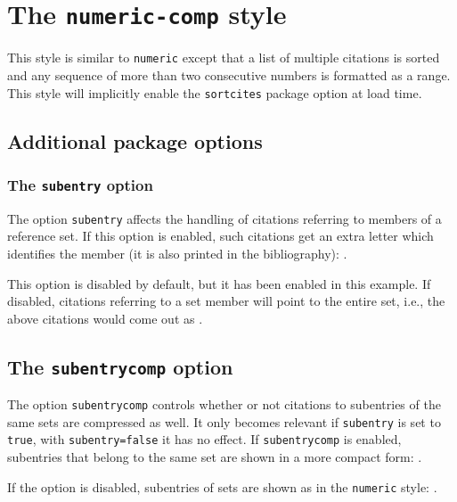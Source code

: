 \documentclass[a4paper]{article}
\begin{document}
\section*{The \texttt{numeric-comp} style}

This style is similar to \texttt{numeric} except that a list of
multiple citations is sorted and any sequence of more than two
consecutive numbers is formatted as a range. This style will
implicitly enable the \texttt{sortcites} package option at load
time.

\subsection*{Additional package options}

\subsubsection*{The \texttt{subentry} option}

The option \texttt{subentry} affects the handling of citations
referring to members of a reference set. If this option is enabled,
such citations get an extra letter which identifies the member
(it is also printed in the bibliography):
\cite{glashow,yoon,salam,aksin,companion}.

This option is disabled by default, but it has been enabled
in this example. If disabled, citations referring to a set member
will point to the entire set, i.e., the above citations would
come out as
\begingroup{}%
\cite{stdmodel,set,stdmodel,set,companion}.
\endgroup

\subsection*{The \texttt{subentrycomp} option}

The option \texttt{subentrycomp} controls whether or not citations
to subentries of the same sets are compressed as well.
It only becomes relevant if \texttt{subentry} is set to \texttt{true},
with \texttt{subentry=false} it has no effect.
If \texttt{subentrycomp} is enabled,
subentries that belong to the same
set are shown in a more compact form:
\cite{glashow,herrmann,aksin,yoon,salam,companion}.

If the option is disabled, subentries of sets are shown as in
the \texttt{numeric} style:
\begingroup\togglefalse{cbx:subentrycomp}%
\cite{glashow,herrmann,aksin,yoon,salam,companion}.
\endgroup
\end{document}

